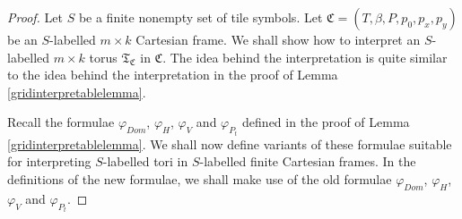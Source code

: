 \documentclass{LMCS}
\theoremstyle{plain}
\newcommand{\mf}{\mathfrak}
\newcommand{\mi}{\mathit}
\begin{document}
\begin{proof}
%
Let $S$ be a finite nonempty set of tile symbols. Let $\mf{C}=(T,\beta,P,p_0,p_x,p_y)$
%
be an $S$-labelled $m\times k$ Cartesian frame. We shall show how to interpret an $S$-labelled $m\times k$ torus
%
 $\mf{T}_\mf{C}$ in $\mf{C}$. The idea behind the
%
interpretation is quite similar to the
%
idea behind the interpretation in the proof of Lemma \ref{gridinterpretablelemma}.
%



%
Recall the formulae $\varphi_{\mi{Dom}}$, $\varphi_{H}$, $\varphi_{V}$ and $\varphi_{P_t}$
%
defined in the proof of Lemma \ref{gridinterpretablelemma}. We shall now define variants of
%
these formulae suitable for interpreting $S$-labelled tori in $S$-labelled finite Cartesian frames.
%
In the definitions of the new formulae, we shall make use of the old formulae
%
$\varphi_{\mi{Dom}}$, $\varphi_{H}$, $\varphi_{V}$ and $\varphi_{P_t}$.
%




\end{proof}
\end{document}
